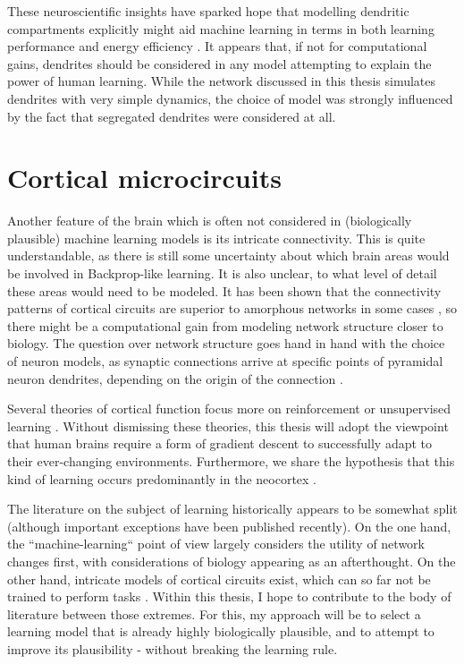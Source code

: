 These neuroscientific insights have  sparked hope that modelling dendritic compartments explicitly might aid machine
learning in terms in both learning performance and energy efficiency
\citep{Chavlis2021,guerguiev2017towards,Richards2019,Eyal2018}. It appears that, if not for computational gains,
dendrites should be considered in any model attempting to explain the power of human learning. While the network
discussed in this thesis simulates dendrites with very simple dynamics, the choice of model was strongly influenced by
the fact that segregated dendrites were considered at all.




\section{Cortical microcircuits}

Another feature of the brain which is often not considered in (biologically plausible) machine learning models is its
intricate connectivity. This is quite understandable, as there is still some uncertainty about which brain areas would
be involved in Backprop-like learning. It is also unclear, to what level of detail these areas would need to be modeled.
It has been shown that the connectivity patterns of cortical circuits are superior to amorphous networks in some cases
\citep{haeusler2007statistical}, so there might be a computational gain from modeling network structure closer to
biology. The question over network structure goes hand in hand with the choice of neuron models, as synaptic connections
arrive at specific points of pyramidal neuron dendrites, depending on the origin of the connection
\citep{felleman1991distributed,Ishizuka1995,Larkum2018}.

Several theories of cortical function focus more on reinforcement \citep{Legenstein2008} or unsupervised learning
\citep{George2009,hausler2017inhibitory}. Without dismissing these theories, this thesis will adopt the viewpoint that
human brains require a form of gradient descent to successfully adapt to their ever-changing environments. Furthermore,
we share the hypothesis that this kind of learning occurs predominantly in the neocortex \citep{Marblestone2016}.

The literature on the subject of learning historically appears to be somewhat split (although important exceptions have
been published recently). On the one hand, the ``machine-learning`` point of view largely considers the utility of network
changes first, with considerations of biology appearing as an afterthought\citeme. On the other hand, intricate models
of cortical circuits exist, which can so far not be trained to perform tasks
\citep{potjans2014cell,schmidt2018multi,van2022bringing}. Within this thesis, I hope to contribute to the body of
literature between those extremes. For this, my approach will be to select a learning model that is already highly
biologically plausible, and to attempt to improve its plausibility - without breaking the learning rule.

